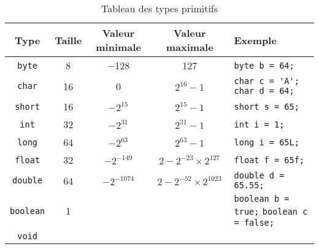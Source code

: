 \begin{table}[h]
	\centering
	\begin{tabular}{|c|c|c|c|m{5cm}|}
		\hline 
			Type & Taille & Valeur minimale & Valeur maximale & Exemple \\
		\hline
			\lstinline|byte| & \SI{8}{\bit} &\num{-128} & \num{127} & \lstinline|byte b = 64;| \\
		\hline 
			\lstinline|char| & \SI{16}{\bit} & \num{0} &$ 2^{16}-1 $& \lstinline|char c = 'A'; char d = 64;| \\
		\hline 
			\lstinline|short| & \SI{16}{\bit} & $ -2^{15}$ & $ 2^{15}-1 $ &  \lstinline|short s = 65;| \\
		\hline 
			\lstinline|int| & \SI{32}{\bit} & $ -2^{31}$ & $ 2^{31}-1 $ & \lstinline|int i = 1;| \\
		\hline
			\lstinline|long| & \SI{64}{\bit} & $ -2^{63}$ & $ 2^{63}-1 $ & \lstinline|long i = 65L;| \\
		\hline
			\lstinline|float| & \SI{32}{\bit} & $ -2^{-149}$ & $ 2-2^{-23} \times 2^{127} $ & \lstinline|float f = 65f;| \\
		\hline
			\lstinline|double| & \SI{64}{\bit} & $ -2^{-1074}$ & $ 2-2^{-52} \times 2^{1023} $ & \lstinline|double d = 65.55;| \\
		\hline
			\lstinline|boolean| & \SI{1}{\bit} & & & \lstinline|boolean b = true;| \lstinline|boolean c = false;| \\
		\hline
			\lstinline|void| & & & & \\
		\hline
	\end{tabular} 
	\caption{Tableau des types primitifs}
	\label{tableautypesprimitifs}
\end{table}